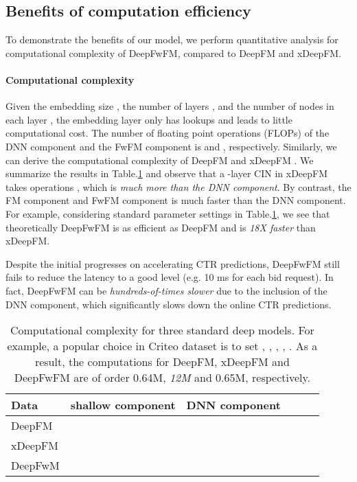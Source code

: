 \documentclass[sigconf]{acmart}
\begin{document}
\subsection{Benefits of computation efficiency}
\label{complexity}




To demonstrate the benefits of our model, we perform quantitative analysis for computational complexity of DeepFwFM, compared to DeepFM and xDeepFM. 

\paragraph{Computational complexity} Given the embedding size , the number of layers , and the number of nodes in each layer , the embedding layer only has  lookups and leads to
little computational cost. The number of floating point operations (FLOPs) of the DNN component and the FwFM component is  and , respectively. Similarly, we can derive the computational complexity of DeepFM \citep{deepfm}
 and xDeepFM \citep{xdeepfm}. We summarize the results in Table.\ref{com_complexity} and observe that a -layer CIN in xDeepFM takes  operations \cite{xdeepfm}, which is \emph{much more than the DNN component}. By contrast, the FM component and FwFM component is much faster than the DNN component. For example, considering standard parameter settings in Table.\ref{com_complexity}, we see that theoretically DeepFwFM is as efficient as DeepFM and is \emph{18X faster} than xDeepFM.
 

Despite the initial progresses on accelerating CTR predictions, DeepFwFM still fails to reduce the latency to a good level (e.g. 10 ms for each bid request). In fact, DeepFwFM can be \emph{hundreds-of-times slower} due to the inclusion of the DNN component, which significantly slows down the online CTR predictions.

\begin{table}
 \caption{Computational complexity for three standard deep models. For example, a popular choice in Criteo dataset is to set , , , , . As a result, the computations for DeepFM, xDeepFM and DeepFwFM are of order 0.64M, \emph{12M} and 0.65M, respectively.}
  \centering
  \begin{tabular}{lccccr}
    \toprule
Data     & shallow component & DNN component    \\
    \midrule
    DeepFM &   &   \\
    xDeepFM &  &  \\
    DeepFwM &  &   \\
    \bottomrule
  \end{tabular}
  \label{com_complexity}
\end{table}
\end{document}
